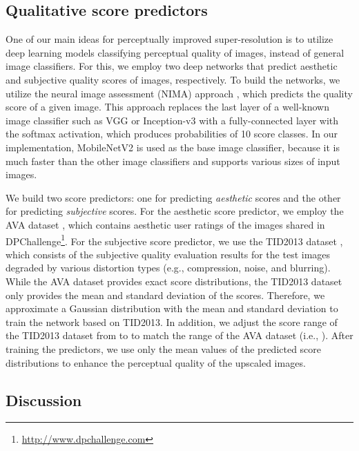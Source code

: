 \documentclass[runningheads]{llncs}
\begin{document}
\subsection{Qualitative score predictors}
\label{sec:qualitative_score_predictors}

One of our main ideas for perceptually improved super-resolution is to utilize deep learning models classifying perceptual quality of images, instead of general image classifiers.
For this, we employ two deep networks that predict aesthetic and subjective quality scores of images, respectively.
To build the networks, we utilize the neural image assessment (NIMA) approach \cite{talebi2018nima}, which predicts the quality score of a given image.
This approach replaces the last layer of a well-known image classifier such as VGG \cite{simonyan2014very} or Inception-v3 \cite{szegedy2016rethinking} with a fully-connected layer with the softmax activation, which produces probabilities of 10 score classes.
In our implementation, MobileNetV2 \cite{sandler2018mobilenetv2} is used as the base image classifier, because it is much faster than the other image classifiers and supports various sizes of input images.

We build two score predictors: one for predicting \textit{aesthetic} scores and the other for predicting \textit{subjective} scores.
For the aesthetic score predictor, we employ the AVA dataset \cite{murray2012ava}, which contains aesthetic user ratings of the images shared in DPChallenge\footnote{\url{http://www.dpchallenge.com}}.
For the subjective score predictor, we use the TID2013 dataset \cite{ponomarenko2015image}, which consists of the subjective quality evaluation results for the test images degraded by various distortion types (e.g., compression, noise, and blurring).
While the AVA dataset provides exact score distributions, the TID2013 dataset only provides the mean and standard deviation of the scores.
Therefore, we approximate a Gaussian distribution with the mean and standard deviation to train the network based on TID2013.
In addition, we adjust the score range of the TID2013 dataset from  to  to match the range of the AVA dataset (i.e., ).
After training the predictors, we use only the mean values of the predicted score distributions to enhance the perceptual quality of the upscaled images.


\subsection{Discussion}
\label{sec:structure_discussion}
\end{document}
